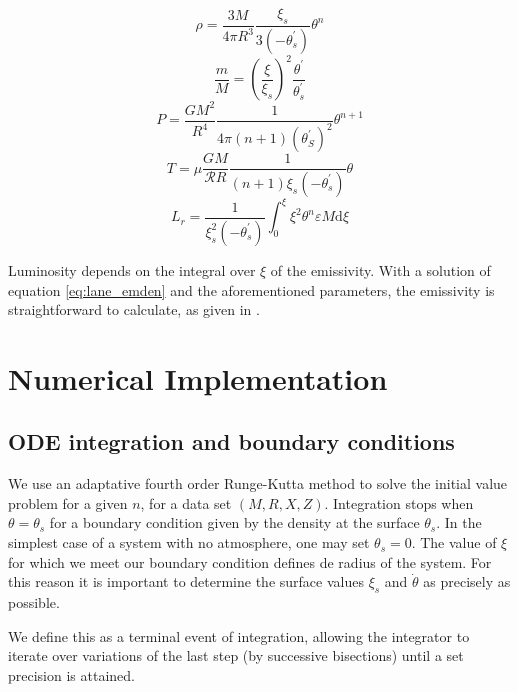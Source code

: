 \documentclass{aa}
\begin{document}
\begin{equation}
  \label{eq:density}
  \rho=\frac{3 M}{4 \pi R^{3}} \frac{\xi_{s}}{3\left(-\theta_{s}^{\prime}\right)} \theta^{n}
\end{equation}
\begin{equation}
  \label{eq:mass}
  \frac{m}{M} = \left(\frac{\xi}{\xi_{s}}\right)^{2} \frac{\theta^{\prime}}{\theta_{s}^{\prime}}
\end{equation}
\begin{equation}
  \label{eq:pressure}
  P=\frac{G M^{2}}{R^{4}} \frac{1}{4 \pi(n+1)\left(\theta_{S}^{\prime}\right)^{2}} \theta^{n+1}
\end{equation}
\begin{equation}
  \label{eq:temperature}
  T=\mu \frac{G M}{\mathscr{R} R} \frac{1}{(n+1) \xi_{s}\left(-\theta_{s}^{\prime}\right)} \theta 
\end{equation}
\begin{equation}
  \label{eq:luminosity}
  L_{r}=\frac{1}{\xi_{s}^{2}\left(-\theta_{s}^{\prime}\right)} \int_{0}^{\xi} \xi^{2} \theta^{n} \varepsilon M \mathrm{d} \xi
\end{equation}

Luminosity depends on the integral over $\xi$ of the emissivity. With a solution
of equation \ref{eq:lane_emden} and the aforementioned parameters, the
emissivity is straightforward to calculate, as given in \cite{monteiro_sebenta_2019}.

\section{Numerical Implementation}
\label{sec:method}

\subsection{ODE integration and boundary conditions}

We use an adaptative fourth order Runge-Kutta method to solve the initial value
problem for a given $n$, for a data set $(M, R, X, Z)$. Integration stops when $\theta  = \theta_s$ for a
boundary condition given by the density at the surface $\theta_s$. In the
simplest case of a system with no atmosphere, one may set $\theta_s = 0$. The
value of $\xi$ for which we meet our boundary condition defines de radius of the
system. For this reason it is important to determine the surface values $\xi_s$
and $\dot{\theta}$ as precisely as possible.

We define this as a terminal event of integration, allowing the integrator to
iterate over variations of the last step (by successive bisections) until a set
precision is attained.
\end{document}
